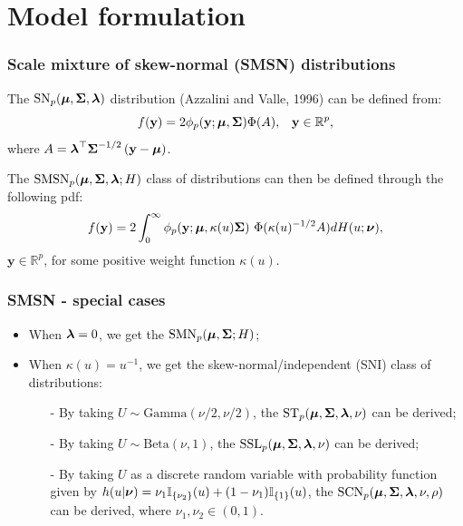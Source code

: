 \section{Model formulation}
\begin{frame}\frametitle{Scale mixture of skew-normal (SMSN) distributions}
The $\textrm{SN}_p(\mbox{${ \bm \mu}$},\mbox{${ \bm \Sigma}$},\mathbf{\mbox{${ \bm \lambda}$}})$ distribution (Azzalini and Valle, 1996) can be defined from:
\begin{equation*}
    f(\mathbf{y})=2\phi_p(\mathbf{y};\mbox{${ \bm \mu}$}, \mbox{${ \bm \Sigma}$})
\Phi(A),\,\,\,\,\,\mathbf{y}\in \mathbb{R}^p,
\end{equation*}
where $A = \mbox{${ \bm \lambda}$}^{\top}
\mbox{${ \bm \Sigma}$}^{-1/2}\left(\mathbf{y}-\mbox{${ \bm \mu}$}\right)$.
\pause \vspace{.4cm}

The $\textrm{SMSN}_p(\mbox{${ \bm \mu}$},\mbox{${ \bm \Sigma}$},\mathbf{\mbox{${ \bm \lambda}$}};H)$ class of distributions can then be defined through the following pdf:
\begin{equation*}
f(\mathbf{y})=2\int_{0}^{\infty}\phi_p(\mathbf{y};\mbox{${ \bm \mu}$},\kappa(u) \mbox{${ \bm \Sigma}$})\
\Phi(\kappa(u)^{-1/2} A)d H(u;\mbox{${ \bm \nu}$}),
\end{equation*}
$\mathbf{y}\in \mathbb{R}^p$, for some positive weight function $\kappa(u)$.
\end{frame}
\begin{frame}\frametitle{SMSN - special cases}
\begin{itemize}\setlength{\itemsep}{\fill}
    \item When $\mbox{${ \bm \lambda}$}=0$, we get the $\textrm{SMN}_p(\mbox{${ \bm \mu}$},\mbox{${ \bm \Sigma}$} ;H)$;
    \item When  $\kappa(u)=u^{-1}$, we get the skew-normal/independent (SNI) class of distributions:
    \begin{itemize}\setlength{\itemsep}{.3cm}
        \item[-] By taking $U\sim \textrm{Gamma}(\nu/2,\nu/2)$, the $\textrm{ST}_p(\mbox{${ \bm \mu}$},\mbox{${ \bm \Sigma}$},\mbox{${ \bm \lambda}$},\nu)$ can be derived;
        \item[-] By taking $U\sim \textrm{Beta}(\nu,1)$, the $\textrm{SSL}_p(\mbox{${ \bm \mu}$},\mbox{${ \bm \Sigma}$},\mbox{${ \bm \lambda}$},\nu)$ can be derived;
        \item[-] By taking $U$ as a discrete random variable with probability function given by  $h(u|\mbox{${ \bm \nu}$})=\nu_1 \mathbb{I}_{\{\nu_2\}}(u)+(1-\nu_1) \mathbb{I}_{\{1\}}(u)$, the $\textrm{SCN}_p(\mbox{${ \bm \mu}$},\mbox{${ \bm \Sigma}$},\mbox{${ \bm \lambda}$},\nu,\rho)$ can be derived, where $\nu_1,\nu_2\in (0,1)$.
    \end{itemize}
\end{itemize}
\end{frame}
